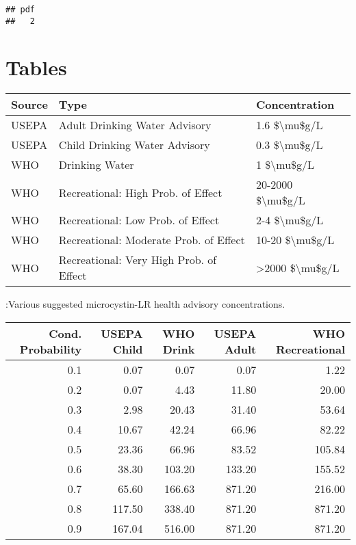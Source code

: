 \documentclass[10pt,a4paper,twocolumn]{article}
\begin{document}
\newpage

\begin{verbatim}
## pdf 
##   2
\end{verbatim}

\newpage

\section{Tables}\label{tables}

\begin{tabular}{l|l|l}
\hline
Source & Type & Concentration\\
\hline
USEPA & Adult Drinking Water Advisory & 1.6 \$\textbackslash{}mu\$g/L\\
\hline
USEPA & Child Drinking Water Advisory & 0.3 \$\textbackslash{}mu\$g/L\\
\hline
WHO & Drinking Water & 1 \$\textbackslash{}mu\$g/L\\
\hline
WHO & Recreational: High Prob. of Effect & 20-2000 \$\textbackslash{}mu\$g/L\\
\hline
WHO & Recreational: Low Prob. of Effect & 2-4 \$\textbackslash{}mu\$g/L\\
\hline
WHO & Recreational: Moderate Prob. of Effect & 10-20 \$\textbackslash{}mu\$g/L\\
\hline
WHO & Recreational: Very High Prob. of Effect & >2000 \$\textbackslash{}mu\$g/L\\
\hline
\end{tabular}

:Various suggested microcystin-LR health advisory concentrations.
\label{tab:microcystin_levels}

\newpage

\begin{tabular}{r|r|r|r|r}
\hline
Cond. Probability & USEPA Child & WHO Drink & USEPA Adult & WHO Recreational\\
\hline
0.1 & 0.07 & 0.07 & 0.07 & 1.22\\
\hline
0.2 & 0.07 & 4.43 & 11.80 & 20.00\\
\hline
0.3 & 2.98 & 20.43 & 31.40 & 53.64\\
\hline
0.4 & 10.67 & 42.24 & 66.96 & 82.22\\
\hline
0.5 & 23.36 & 66.96 & 83.52 & 105.84\\
\hline
0.6 & 38.30 & 103.20 & 133.20 & 155.52\\
\hline
0.7 & 65.60 & 166.63 & 871.20 & 216.00\\
\hline
0.8 & 117.50 & 338.40 & 871.20 & 871.20\\
\hline
0.9 & 167.04 & 516.00 & 871.20 & 871.20\\
\hline
\end{tabular}
\end{document}

